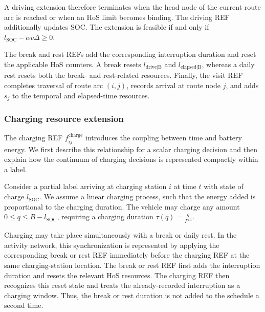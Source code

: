 \documentclass[3p,11pt,authoryear]{elsarticle}  %
\begin{document}
A driving extension therefore terminates when the head node of the
current route arc is reached or when an HoS limit becomes binding. 
The driving REF additionally updates SOC. The
extension is feasible if and only if $l_{\mathrm{SOC}}-\alpha v \Delta \geq 0.$


The break and rest REFs add the corresponding interruption duration and reset the applicable HoS counters. A break resets \(l_{\mathrm{drive|B}}\) and \(l_{\mathrm{elapsed|B}}\), whereas a daily rest resets both the break- and rest-related resources. Finally, the visit REF completes traversal of route arc \((i,j)\), records arrival at route node \(j\), and adds \(s_j\) to the temporal and elapsed-time resources.


\subsubsection{Charging resource extension}
\label{sec:charging_ref}

The charging REF \(f_{ij}^{\mathrm{charge}}\) introduces the coupling between time and battery energy. We first describe this relationship for a scalar charging decision and then explain how the continuum of charging decisions is represented compactly within a label.


Consider a partial label arriving at charging station \(i\) at time \(t\) with
state of charge \(l_{\mathrm{SOC}}\). 
We assume a linear charging
process, such that the energy added is proportional to the charging
duration. The vehicle may charge any amount $0\leq q\leq B-l_{\mathrm{SOC}}$, 
requiring a charging duration $\tau(q)=\frac{q}{P^{\mathrm{ch}}}$.


Charging may take place simultaneously with a break or daily rest. In
the activity network, this synchronization is represented by applying
the corresponding break or rest REF immediately before the charging
REF at the same charging-station location. The break or rest REF first
adds the interruption duration and resets the relevant HoS resources.
The charging REF then recognizes this reset state and treats the
already-recorded interruption as a charging window. Thus, the break or
rest duration is not added to the schedule a second time.
\end{document}
